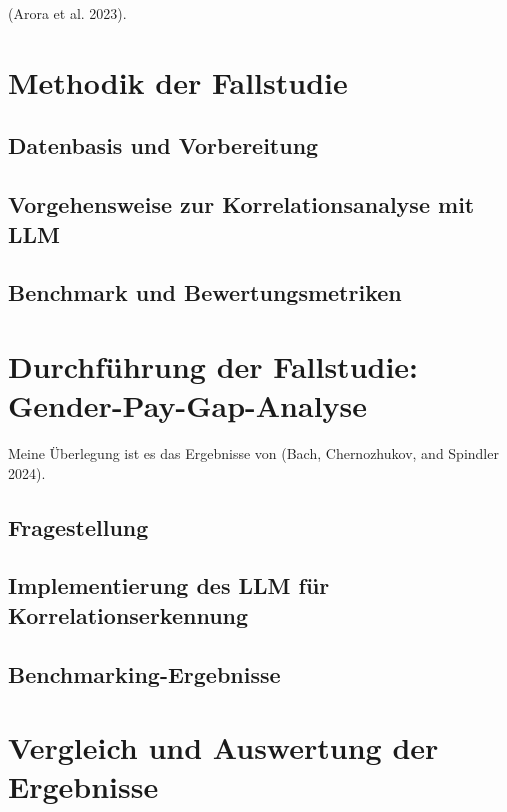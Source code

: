 \documentclass[
  11pt,
]{report}
\begin{document}
(Arora et al. 2023).

\chapter{Methodik der Fallstudie}\label{methodik-der-fallstudie}

\section{Datenbasis und Vorbereitung}\label{datenbasis-und-vorbereitung}

\section{Vorgehensweise zur Korrelationsanalyse mit
LLM}\label{vorgehensweise-zur-korrelationsanalyse-mit-llm}

\section{Benchmark und
Bewertungsmetriken}\label{benchmark-und-bewertungsmetriken}

\chapter{Durchführung der Fallstudie:
Gender-Pay-Gap-Analyse}\label{durchfuxfchrung-der-fallstudie-gender-pay-gap-analyse}

Meine Überlegung ist es das Ergebnisse von (Bach, Chernozhukov, and
Spindler 2024).

\section{Fragestellung}\label{fragestellung}

\section{Implementierung des LLM für
Korrelationserkennung}\label{implementierung-des-llm-fuxfcr-korrelationserkennung}

\section{Benchmarking-Ergebnisse}\label{benchmarking-ergebnisse}

\chapter{Vergleich und Auswertung der
Ergebnisse}\label{vergleich-und-auswertung-der-ergebnisse}
\end{document}
